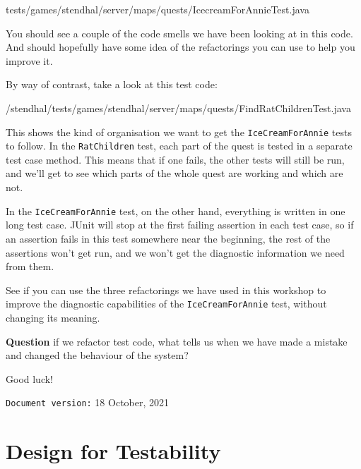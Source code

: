 \documentclass[
]{book}
\newenvironment{Shaded}{\begin{snugshade}}{\end{snugshade}}
\newcommand{\FunctionTok}[1]{\textcolor[rgb]{0.00,0.00,0.00}{#1}}
\newcommand{\NormalTok}[1]{#1}
\begin{document}
\begin{Shaded}
\begin{Highlighting}[]
\NormalTok{tests/games/stendhal/server/maps/quests/IcecreamForAnnieTest.}\FunctionTok{java}
\end{Highlighting}
\end{Shaded}

You should see a couple of the code smells we have been looking at in this code. And should hopefully have some idea of the refactorings you can use to help you improve it.

By way of contrast, take a look at this test code:

\begin{Shaded}
\begin{Highlighting}[]
\NormalTok{/stendhal/tests/games/stendhal/server/maps/quests/FindRatChildrenTest.}\FunctionTok{java}
\end{Highlighting}
\end{Shaded}

This shows the kind of organisation we want to get the \texttt{IceCreamForAnnie} tests to follow. In the \texttt{RatChildren} test, each part of the quest is tested in a separate test case method. This means that if one fails, the other tests will still be run, and we'll get to see which parts of the whole quest are working and which are not.

In the \texttt{IceCreamForAnnie} test, on the other hand, everything is written in one long test case. JUnit will stop at the first failing assertion in each test case, so if an assertion fails in this test somewhere near the beginning, the rest of the assertions won't get run, and we won't get the diagnostic information we need from them.

See if you can use the three refactorings we have used in this workshop to improve the diagnostic capabilities of the \texttt{IceCreamForAnnie} test, without changing its meaning.

\textbf{Question} if we refactor test code, what tells us when we have made a mistake and changed the behaviour of the system?

Good luck!

\texttt{Document\ version:} 18 October, 2021

\hypertarget{designing}{%
\chapter{Design for Testability}\label{designing}}
\end{document}

